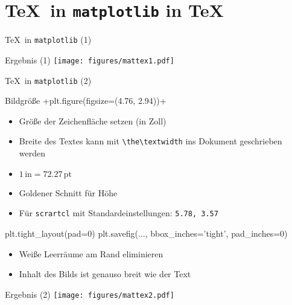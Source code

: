 \section{\TeX\ in \texttt{matplotlib} in \TeX}

\begin{frame}[fragile]{\TeX\ in \texttt{matplotlib} (1)}
\end{frame}

\AddToShipoutPictureFG*{\ShowFramePicture}
\begin{frame}{Ergebnis (1)}
  \centering
  \texttt{[image: figures/mattex1.pdf]}
\end{frame}

\begin{frame}[fragile]{\TeX\ in \texttt{matplotlib} (2)}
\end{frame}

\begin{frame}[fragile]{Bildgröße}
  \lstpythoninline+plt.figure(figsize=(4.76, 2.94))+
  \begin{itemize}
    \item Größe der Zeichenfläche setzen (in Zoll)
    \item Breite des Textes kann mit \lstinline+\the\textwidth+ ins Dokument geschrieben werden
    \item $1\,\mathrm{in} = \num{72.27}\,\mathrm{pt}$
    \item Goldener Schnitt für Höhe
    \item Für \texttt{scrartcl} mit Standardeinstellungen: \texttt{5.78, 3.57}
  \end{itemize}

  \begin{lstpython}
    plt.tight_layout(pad=0)
    plt.savefig(..., bbox_inches='tight', pad_inches=0)
  \end{lstpython}
  \begin{itemize}
    \item Weiße Leerräume am Rand eliminieren
    \item Inhalt des Bilds ist genauso breit wie der Text
  \end{itemize}
\end{frame}

\AddToShipoutPictureFG*{\ShowFramePicture}
\begin{frame}{Ergebnis (2)}
  \centering
  \texttt{[image: figures/mattex2.pdf]}
\end{frame}

